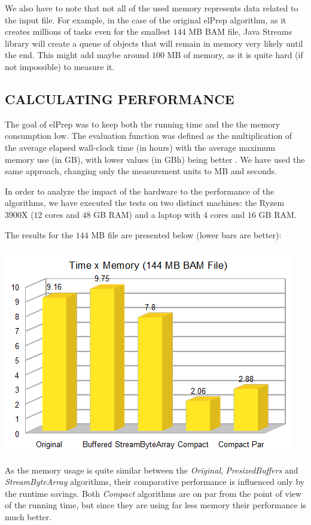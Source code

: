 \documentclass[a4paper,twoside]{article}
\begin{document}
{We also have to note that not all of the used memory represents data related to the input file.
For example, in the case of the original elPrep algorithm, as it creates millions of tasks even for the smallest $144$ MB BAM file, Java Streams library will create a queue of objects that will remain in memory very likely until the end. This might add maybe around $100$ MB of memory, as it is quite hard (if not impossible) to measure it.

 
\subsection{\uppercase{Calculating Performance}}
\label{subsec:performance}
The goal of elPrep was to keep both the running time and the the memory consumption low. The evaluation function was defined as the multiplication of the average elapsed wall-clock time (in hours) with the average maximum memory use (in GB), with lower values (in GBh) being better \cite{costanza:2019}.
We have used the same approach, changing only the measurement units to MB and seconds.

In order to analyze the impact of the hardware to the performance of the algorithms, we have executed the tests on two distinct machines: the Ryzem 3900X ($1$2 cores and $48$ GB RAM) and a laptop with $4$ cores and $16$ GB RAM.

The results for the $144$ MB file are presented below (lower bars are better):
\begin{center}
	\includegraphics[scale=0.5]{images/times_and_memory_chart_small_144mb_ryzen.png}
\end{center}

As the memory usage is quite similar between the \textit{Original}, \textit{PresizedBuffers} and \textit{StreamByteArray} algorithms, their comparative performance is influenced only by the runtime savings.
Both \textit{Compact} algorithms are on par from the point of view of the running time, but since they are using far less memory their performance is much better.

}
\end{document}
